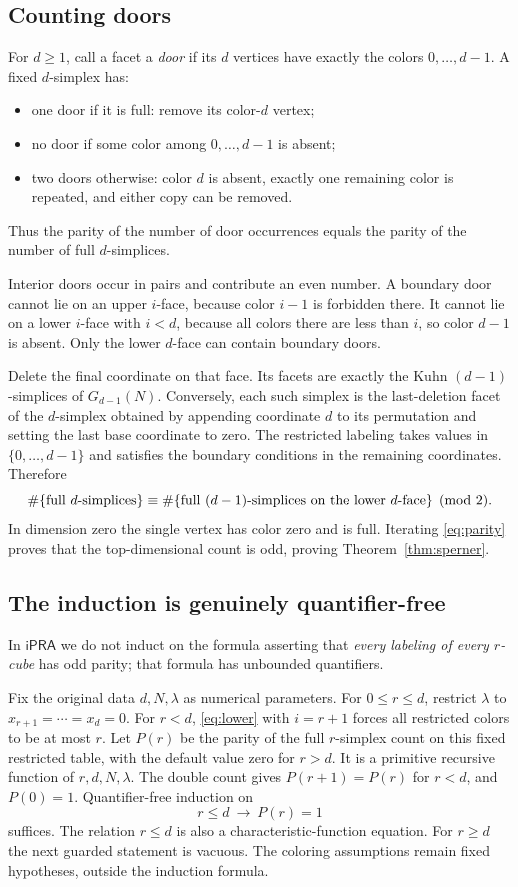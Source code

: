 \documentclass[11pt,a4paper]{article}
\theoremstyle{definition}
\newcommand{\ipra}{\mathsf{iPRA}}
\begin{document}
\subsection{Counting doors}
For $d\geq1$, call a facet a \emph{door} if its $d$ vertices have
exactly the colors $0,\ldots,d-1$. A fixed $d$-simplex has:
\begin{itemize}
\item one door if it is full: remove its color-$d$ vertex;
\item no door if some color among $0,\ldots,d-1$ is absent;
\item two doors otherwise: color $d$ is absent, exactly one
remaining color is repeated, and either copy can be removed.
\end{itemize}
Thus the parity of the number of door occurrences equals the
parity of the number of full $d$-simplices.

Interior doors occur in pairs and contribute an even number.
A boundary door cannot lie on an upper $i$-face, because color
$i-1$ is forbidden there. It cannot lie on a lower $i$-face with
$i<d$, because all colors there are less than $i$, so color $d-1$
is absent. Only the lower $d$-face can contain boundary doors.

Delete the final coordinate on that face. Its facets are exactly
the Kuhn $(d-1)$-simplices of $G_{d-1}(N)$. Conversely, each such
simplex is the last-deletion facet of the $d$-simplex obtained by
appending coordinate $d$ to its permutation and setting the last
base coordinate to zero. The restricted labeling takes values in
$\{0,\ldots,d-1\}$ and satisfies the boundary conditions in the
remaining coordinates. Therefore
\begin{equation}\label{eq:parity}
 \#\{\hbox{full $d$-simplices}\}
 \equiv
 \#\{\hbox{full $(d-1)$-simplices on the lower $d$-face}\}
 \pmod2.
\end{equation}
In dimension zero the single vertex has color zero and is full.
Iterating \eqref{eq:parity} proves that the top-dimensional count
is odd, proving Theorem~\ref{thm:sperner}.

\subsection{The induction is genuinely quantifier-free}
In $\ipra$ we do not induct on the formula asserting that
\emph{every labeling of every $r$-cube} has odd parity; that formula
has unbounded quantifiers.

Fix the original data $d,N,\lambda$ as numerical parameters.
For $0\leq r\leq d$, restrict $\lambda$ to
$x_{r+1}=\cdots=x_d=0$. For $r<d$, \eqref{eq:lower} with
$i=r+1$ forces all restricted colors to be at most $r$.
Let $P(r)$ be the parity of the full $r$-simplex count on this
fixed restricted table, with the default value zero for $r>d$.
It is a primitive recursive function of
$r,d,N,\lambda$. The double count gives $P(r+1)=P(r)$ for $r<d$,
and $P(0)=1$. Quantifier-free induction on
\[
                 r\leq d\ \longrightarrow\ P(r)=1
\]
suffices. The relation $r\leq d$ is also a characteristic-function
equation. For $r\geq d$ the next guarded statement is vacuous.
The coloring assumptions remain fixed hypotheses, outside the
induction formula.
\end{document}
